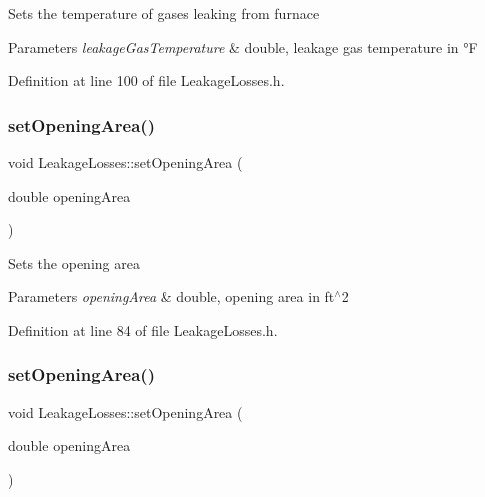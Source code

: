 Sets the temperature of gases leaking from furnace 
\begin{DoxyParams}{Parameters}
{\em leakage\+Gas\+Temperature} & double, leakage gas temperature in °F \\
\hline
\end{DoxyParams}


Definition at line 100 of file Leakage\+Losses.\+h.

\mbox{\label{class_leakage_losses_a417c9914af6b283695bdbd5e92451f9e}} 
\subsubsection{\texorpdfstring{set\+Opening\+Area()}{setOpeningArea()}\hspace{0.1cm}{\footnotesize\ttfamily [1/3]}}
{\footnotesize\ttfamily void Leakage\+Losses\+::set\+Opening\+Area (\begin{DoxyParamCaption}\item[{double}]{opening\+Area }\end{DoxyParamCaption})\hspace{0.3cm}{\ttfamily [inline]}}

Sets the opening area 
\begin{DoxyParams}{Parameters}
{\em opening\+Area} & double, opening area in ft$^\wedge$2 \\
\hline
\end{DoxyParams}


Definition at line 84 of file Leakage\+Losses.\+h.

\mbox{\label{class_leakage_losses_a417c9914af6b283695bdbd5e92451f9e}} 
\subsubsection{\texorpdfstring{set\+Opening\+Area()}{setOpeningArea()}\hspace{0.1cm}{\footnotesize\ttfamily [2/3]}}
{\footnotesize\ttfamily void Leakage\+Losses\+::set\+Opening\+Area (\begin{DoxyParamCaption}\item[{double}]{opening\+Area }\end{DoxyParamCaption})\hspace{0.3cm}{\ttfamily [inline]}}


